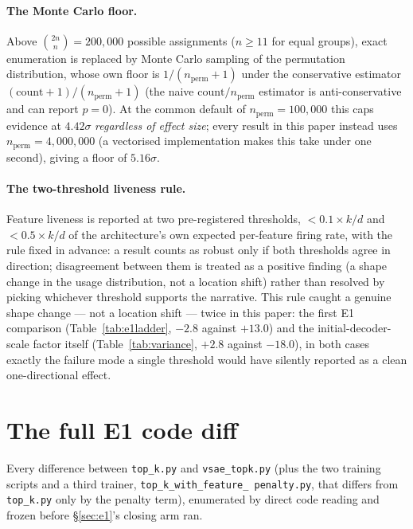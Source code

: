 \documentclass[11pt]{article}
\begin{document}
\paragraph{The Monte Carlo floor.} Above $\binom{2n}{n}=200{,}000$ possible
assignments ($n\ge11$ for equal groups), exact enumeration is
replaced by Monte Carlo sampling of the permutation distribution, whose own
floor is $1/(n_{\mathrm{perm}}+1)$ under the conservative estimator
$(\mathrm{count}+1)/(n_{\mathrm{perm}}+1)$ (the naive $\mathrm{count}/n_{\mathrm{perm}}$
estimator is anti-conservative and can report $p=0$). At the common default
of $n_{\mathrm{perm}}=100{,}000$ this caps evidence at $4.42\sigma$
\emph{regardless of effect size}; every result in this paper instead uses
$n_{\mathrm{perm}}=4{,}000{,}000$ (a vectorised implementation makes this
take under one second), giving a floor of $5.16\sigma$.

\paragraph{The two-threshold liveness rule.} Feature liveness is reported at
two pre-registered thresholds, $<0.1\times k/d$ and $<0.5\times k/d$ of the
architecture's own expected per-feature firing rate, with the rule fixed in
advance: a result counts as robust only if both thresholds agree in
direction; disagreement between them is treated as a positive finding (a
shape change in the usage distribution, not a location shift) rather than
resolved by picking whichever threshold supports the narrative. This rule
caught a genuine shape change --- not a location shift --- twice in this
paper: the first E1 comparison (Table~\ref{tab:e1ladder}, $-2.8$ against
$+13.0$) and the initial-decoder-scale factor itself
(Table~\ref{tab:variance}, $+2.8$ against $-18.0$), in both cases exactly the
failure mode a single threshold would have silently reported as a clean
one-directional effect.

\section{The full E1 code diff}
\label{app:e1diff}

Every difference between \texttt{top\_k.py} and \texttt{vsae\_topk.py} (plus
the two training scripts and a third trainer, \texttt{top\_k\_with\_feature\_
penalty.py}, that differs from \texttt{top\_k.py} only by the penalty term),
enumerated by direct code reading and frozen before \S\ref{sec:e1}'s closing
arm ran.
\end{document}
